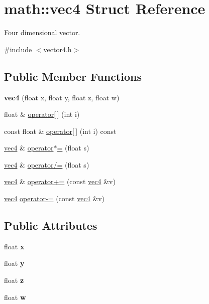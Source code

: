 \hypertarget{structmath_1_1vec4}{}\section{math\+:\+:vec4 Struct Reference}
\label{structmath_1_1vec4}


Four dimensional vector.  




{\ttfamily \#include $<$vector4.\+h$>$}

\subsection*{Public Member Functions}
\begin{DoxyCompactItemize}
\item 
\mbox{\label{structmath_1_1vec4_adf056554f6db3e629d32909ebc4e71c5}} 
{\bfseries vec4} (float x, float y, float z, float w)
\item 
float \& \hyperlink{structmath_1_1vec4_af467f0f57b5071d1dba3e5ddc1dc1c15}{operator\mbox{[}$\,$\mbox{]}} (int i)
\item 
const float \& \hyperlink{structmath_1_1vec4_a001a7e67abbd893ba55b74f43e31f554}{operator\mbox{[}$\,$\mbox{]}} (int i) const
\item 
\hyperlink{structmath_1_1vec4}{vec4} \& \hyperlink{structmath_1_1vec4_a1308a1344a9c95b9e74ffe0cf991c3ca}{operator$\ast$=} (float s)
\item 
\hyperlink{structmath_1_1vec4}{vec4} \& \hyperlink{structmath_1_1vec4_a659b3011316a6d357be57dd69a1f7217}{operator/=} (float s)
\item 
\hyperlink{structmath_1_1vec4}{vec4} \& \hyperlink{structmath_1_1vec4_ac3c42d2c2cb0c72a7d53f86c9a16016e}{operator+=} (const \hyperlink{structmath_1_1vec4}{vec4} \&v)
\item 
\hyperlink{structmath_1_1vec4}{vec4} \hyperlink{structmath_1_1vec4_a2ab8d4652ee7f7d4150d669b188fd70f}{operator-\/=} (const \hyperlink{structmath_1_1vec4}{vec4} \&v)
\end{DoxyCompactItemize}
\subsection*{Public Attributes}
\begin{DoxyCompactItemize}
\item 
\mbox{\label{structmath_1_1vec4_a4fdbdf4663033c52af87921a30db1952}} 
float {\bfseries x}
\item 
\mbox{\label{structmath_1_1vec4_afacd49516ee40dc7972f7ee3704cad04}} 
float {\bfseries y}
\item 
\mbox{\label{structmath_1_1vec4_a3346f6924554c251c32fea4b95ea7402}} 
float {\bfseries z}
\item 
\mbox{\label{structmath_1_1vec4_a260d5e49ff0b66b99db21df283d1cea1}} 
float {\bfseries w}
\end{DoxyCompactItemize}
